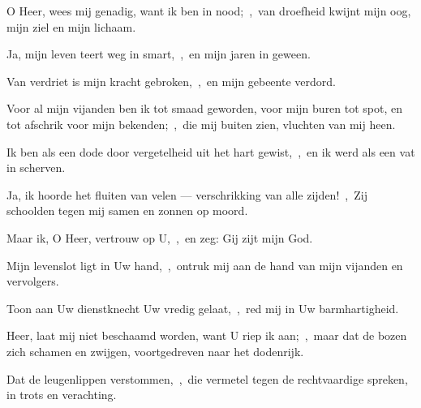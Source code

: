 \documentclass[12pt,twoside,a5paper]{article}
\begin{document}

\begin{halfparskip}
  O Heer, wees mij genadig, want ik ben in nood;~\sep\ van droefheid kwijnt mijn oog, mijn ziel en mijn lichaam.

  Ja, mijn leven teert weg in smart,~\sep\ en mijn jaren in geween.

  Van verdriet is mijn kracht gebroken,~\sep\ en mijn gebeente verdord.

  Voor al mijn vijanden ben ik tot smaad geworden, voor mijn buren tot spot, en tot afschrik voor mijn bekenden;~\sep\ die mij buiten zien, vluchten van mij heen.

  Ik ben als een dode door vergetelheid uit het hart gewist,~\sep\ en ik werd als een vat in scherven.

  Ja, ik hoorde het fluiten van velen --- verschrikking van alle zijden!~\sep\ Zij schoolden tegen mij samen en zonnen op moord.
\end{halfparskip}


\begin{halfparskip}
  Maar ik, O Heer, vertrouw op U,~\sep\ en zeg: Gij zijt mijn God.

  Mijn levenslot ligt in Uw hand,~\sep\ ontruk mij aan de hand van mijn vijanden en vervolgers.

  Toon aan Uw dienstknecht Uw vredig gelaat,~\sep\ red mij in Uw barmhartigheid.

  Heer, laat mij niet beschaamd worden, want U riep ik aan;~\sep\ maar dat de bozen zich schamen en zwijgen, voortgedreven naar het dodenrijk.

  Dat de leugenlippen verstommen,~\sep\ die vermetel tegen de rechtvaardige spreken, in trots en verachting.
\end{halfparskip}

\end{document}
